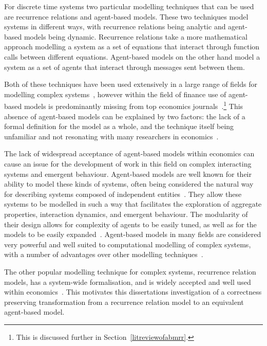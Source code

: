 \documentclass{article}
\begin{document}
For discrete time systems two particular modelling techniques that can be used are recurrence relations and agent-based models. These two techniques model systems in different ways, with recurrence relations being analytic and agent-based models being dynamic. Recurrence relations take a more mathematical approach modelling a system as a set of equations that interact through function calls between different equations. Agent-based models on the other hand model a system as a set of agents that interact through messages sent between them.    

Both of these techniques have been used extensively in a large range of fields for modelling complex systems~\cite{wsabm}, however within the field of finance use of agent-based models is predominantly missing from top economics journals~\cite{whereabmp, farmerfoleynature}.\footnote{This is discussed further in Section~\ref{litreviewofabmrr}.} This absence of agent-based models can be explained by two factors: the lack of a formal definition for the model as a whole, and the technique itself being unfamiliar and not resonating with many researchers in economics~\cite{farmerfoleynature}. 

The lack of widespread acceptance of agent-based models within economics can cause an issue for the development of work in this field on complex interacting systems and emergent behaviour. Agent-based models are well known for their ability to model these kinds of systems, often being considered the natural way for describing systems composed of independent entities~\cite{techsadsProbsabm}. They allow these systems to be modelled in such a way that facilitates the exploration of aggregate properties, interaction dynamics, and emergent behaviour. The modularity of their design allows for complexity of agents to be easily tuned, as well as for the models to be easily expanded~\cite{techsadsProbsabm}. Agent-based models in many fields are considered very powerful and well suited to computational modelling of complex systems, with a number of advantages over other modelling techniques~\cite{whereabmp, abmgood1, abmgreat2, gabm3, gabm5}. 

The other popular modelling technique for complex systems, recurrence relation models, has a system-wide formalisation, and is widely accepted and well used within economics~\cite{acrr, rra10, rra1}. This motivates this dissertations investigation of a correctness preserving transformation from a recurrence relation model to an equivalent agent-based model.
\end{document}
